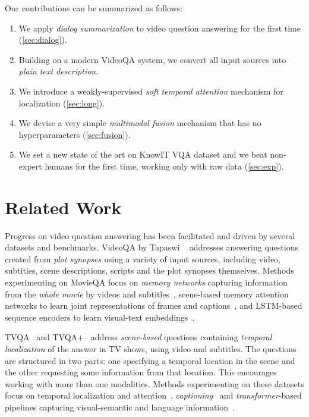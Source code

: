 \documentclass[10pt,twocolumn,letterpaper]{article}
\makeatletter
\renewcommand\paragraph{\@startsection{paragraph}{4}{\z@}{1ex}{-1em}{\normalfont\normalsize\bfseries}}
\makeatother
\begin{document}
Our contributions can be summarized as follows:
\begin{enumerate}[itemsep=2pt, parsep=0pt, topsep=3pt]
    \item We apply \emph{dialog summarization} to video question answering for the first time (\autoref{sec:dialog}).
    \item Building on a modern VideoQA system, we convert all input sources into \emph{plain text description}.
    \item We introduce a weakly-supervised \emph{soft temporal attention} mechanism for localization (\autoref{sec:long}).
    \item We devise a very simple \emph{multimodal fusion} mechanism that has no hyperparameters (\autoref{sec:fusion}).
    \item We set a new state of the art on KnowIT VQA dataset \cite{garcia2020knowit} and we beat non-expert humans for the first time, working only with raw data (\autoref{sec:exp}).
\end{enumerate}
 \section{Related Work}
\label{sec:related}



\paragraph{Video Question Answering} 

Progress on video question answering has been facilitated and driven by several datasets and benchmarks. VideoQA by Tapaswi \etal~\cite{TZS+16} addresses answering questions created from \emph{plot synopses} using a variety of input sources, including video, subtitles, scene descriptions, scripts and the plot synopses themselves. Methods experimenting on MovieQA focus on \emph{memory networks} capturing information from the \emph{whole movie} by videos and subtitles~\cite{Na_2017_ICCV,kim2019progressive}, scene-based memory attention networks to learn joint representations of frames and captions~\cite{KCKZ18}, and LSTM-based sequence encoders to learn visual-text embeddings~\cite{liang2018focal}. 

TVQA~\cite{lei2018tvqa} and TVQA+~\cite{lei2019tvqa+} address \emph{scene-based} questions containing \emph{temporal localization} of the answer in TV shows, using video and subtitles. The questions are structured in two parts: one specifying a temporal location in the scene and the other requesting some information from that location. This encourages working with more than one modalities. Methods experimenting on these datasets focus on temporal localization and attention~\cite{lei2019tvqa+,Kim_2020_CVPR}, \emph{captioning}~\cite{kim2020dense,Chadha2020iPerceive} and \emph{transformer}-based pipelines capturing visual-semantic and language information~\cite{YGC+20,UMDS20}.
\end{document}
